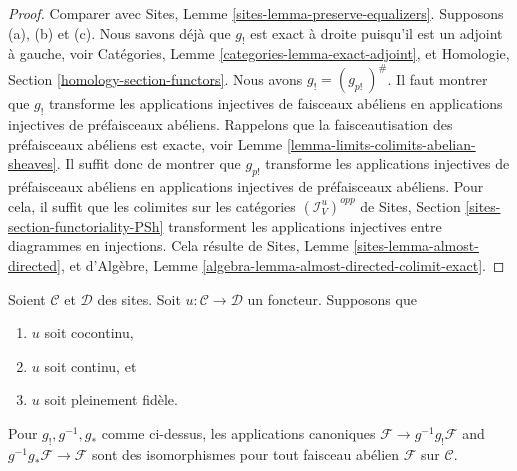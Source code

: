 \begin{proof}
Comparer avec Sites, Lemme \ref{sites-lemma-preserve-equalizers}. Supposons
(a), (b) et (c). Nous savons déjà que $g_!$ est exact à droite puisqu'il est un
adjoint à gauche, voir Catégories, Lemme
\ref{categories-lemma-exact-adjoint}, et Homologie, Section
\ref{homology-section-functors}. Nous avons $g_! = (g_{p!}\ )^\#$. Il faut
montrer que $g_!$ transforme les applications injectives de faisceaux abéliens
en applications injectives de préfaisceaux abéliens. Rappelons que la
faisceautisation des préfaisceaux abéliens est exacte, voir Lemme
\ref{lemma-limits-colimits-abelian-sheaves}. Il suffit donc de montrer que
$g_{p!}$ transforme les applications injectives de préfaisceaux abéliens en
applications injectives de préfaisceaux abéliens. Pour cela, il suffit que les
colimites sur les catégories
$(\mathcal{I}_V^u)^{opp}$ de Sites, Section
\ref{sites-section-functoriality-PSh}
transforment les applications injectives entre diagrammes en injections. Cela
résulte de Sites, Lemme \ref{sites-lemma-almost-directed}, et d'Algèbre, Lemme
\ref{algebra-lemma-almost-directed-colimit-exact}.
\end{proof}

\begin{lemma}
\label{lemma-back-and-forth}
Soient $\mathcal{C}$ et $\mathcal{D}$ des sites. Soit
$u : \mathcal{C} \to \mathcal{D}$ un foncteur. Supposons que
\begin{enumerate}
\item[(a)] $u$ soit cocontinu,
\item[(b)] $u$ soit continu, et
\item[(c)] $u$ soit pleinement fidèle.
\end{enumerate}
Pour $g_!, g^{-1}, g_*$ comme ci-dessus, les applications canoniques
$\mathcal{F} \to g^{-1}g_!\mathcal{F}$ and
$g^{-1}g_*\mathcal{F} \to \mathcal{F}$
sont des isomorphismes pour tout faisceau abélien $\mathcal{F}$ sur
$\mathcal{C}$.
\end{lemma}

